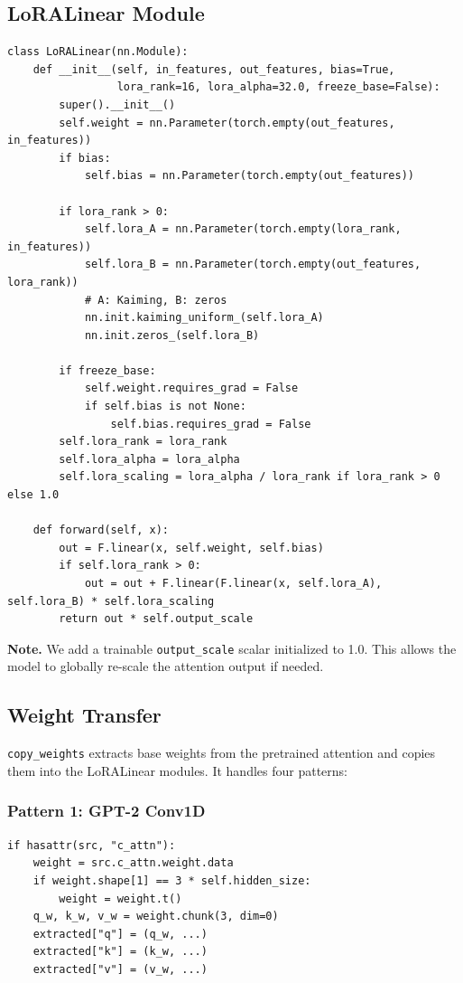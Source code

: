 \subsection{LoRALinear Module}

\begin{lstlisting}
class LoRALinear(nn.Module):
    def __init__(self, in_features, out_features, bias=True, 
                 lora_rank=16, lora_alpha=32.0, freeze_base=False):
        super().__init__()
        self.weight = nn.Parameter(torch.empty(out_features, in_features))
        if bias:
            self.bias = nn.Parameter(torch.empty(out_features))
        
        if lora_rank > 0:
            self.lora_A = nn.Parameter(torch.empty(lora_rank, in_features))
            self.lora_B = nn.Parameter(torch.empty(out_features, lora_rank))
            # A: Kaiming, B: zeros
            nn.init.kaiming_uniform_(self.lora_A)
            nn.init.zeros_(self.lora_B)
        
        if freeze_base:
            self.weight.requires_grad = False
            if self.bias is not None:
                self.bias.requires_grad = False
        self.lora_rank = lora_rank
        self.lora_alpha = lora_alpha
        self.lora_scaling = lora_alpha / lora_rank if lora_rank > 0 else 1.0
    
    def forward(self, x):
        out = F.linear(x, self.weight, self.bias)
        if self.lora_rank > 0:
            out = out + F.linear(F.linear(x, self.lora_A), self.lora_B) * self.lora_scaling
        return out * self.output_scale
\end{lstlisting}

\textbf{Note.} We add a trainable \texttt{output\_scale} scalar initialized to 1.0. This 
allows the model to globally re-scale the attention output if needed.

\subsection{Weight Transfer}

\texttt{copy\_weights} extracts base weights from the pretrained attention and 
copies them into the LoRALinear modules. It handles four patterns:

\subsubsection{Pattern 1: GPT-2 Conv1D}

\begin{lstlisting}
if hasattr(src, "c_attn"):
    weight = src.c_attn.weight.data
    if weight.shape[1] == 3 * self.hidden_size:
        weight = weight.t()
    q_w, k_w, v_w = weight.chunk(3, dim=0)
    extracted["q"] = (q_w, ...)
    extracted["k"] = (k_w, ...)
    extracted["v"] = (v_w, ...)
\end{lstlisting}

